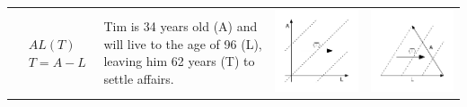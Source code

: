 \documentclass[11pt,oneside,a4paper]{article} %
\begin{document}
\begin{center}
\begin{longtable}{m{}m{}m{}m{}}
  \midrule
  $$\begin{aligned}
    &AL(T) \\
    &T = A - L
  \end{aligned}$$ &  Tim is 34 years old (A) and will live to the age of 96 (L),
  leaving him 62 years (T) to settle affairs.
  & \includegraphics[width = \linewidth]{Figures/JonasTable/ALt.pdf} &
  \includegraphics[width = \linewidth]{Figures/JonasTable/ALt_iso.pdf}  \\

\end{longtable}
\end{center}
\end{document}
